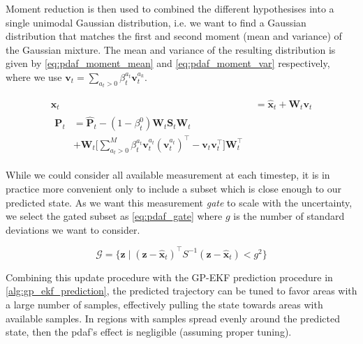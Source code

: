 Moment reduction is then used to combined the different hypothesises into a single unimodal Gaussian distribution, i.e. we want to find a Gaussian distribution that matches the first and second moment (mean and variance) of the Gaussian mixture. The mean and variance of the resulting distribution is given by \cref{eq:pdaf_moment_mean} and \cref{eq:pdaf_moment_var} respectively, where we use $\boldsymbol{v}_t = \sum_{a_t > 0} \beta_t^{a_t} \boldsymbol{v}_t^{a_k}$. 

\begin{subequations}
\begin{align}
    \boldsymbol{x}_t &= \hat{\boldsymbol{x}}_t + \boldsymbol{W}_t \boldsymbol{v}_t \label{eq:pdaf_moment_mean}\\
    \begin{split}
    \boldsymbol{P}_t &= \hat{\boldsymbol{P}}_t - (1 - \beta_t^{0}) \boldsymbol{W}_t \boldsymbol{S}_t  \boldsymbol{W}_t\\ &+ \boldsymbol{W}_t \big[\sum_{a_t > 0}^M \beta_t^{a_t} \boldsymbol{v}_t^{a_t} (\boldsymbol{v}_t^{a_t})^\intercal - \boldsymbol{v}_t \boldsymbol{v}_t^\intercal \big] \boldsymbol{W}_t^\intercal\label{eq:pdaf_moment_var}
    \end{split}
\end{align}
\end{subequations}

While we could consider all available measurement at each timestep, it is in practice more convenient only to include a subset which is close enough to our predicted state. As we want this measurement \textit{gate} to scale with the uncertainty, we select the gated subset as \cref{eq:pdaf_gate} where $g$ is the number of standard deviations we want to consider.

\begin{equation} \label{eq:pdaf_gate}
    \mathcal{G} = \big\{ \boldsymbol{z} \; | \; (\boldsymbol{z} - \hat{\boldsymbol{x}}_t)^\intercal S^{-1} (\boldsymbol{z} - \hat{\boldsymbol{x}}_t) < g^2 \big\}
\end{equation}




Combining this update procedure with the GP-EKF prediction procedure in \cref{alg:gp_ekf_prediction}, the predicted trajectory can be tuned to favor areas with a large number of samples, effectively pulling the state towards areas with available samples. In regions with samples spread evenly around the predicted state, then the \acrshort{pdaf}'s effect is negligible (assuming proper tuning).

